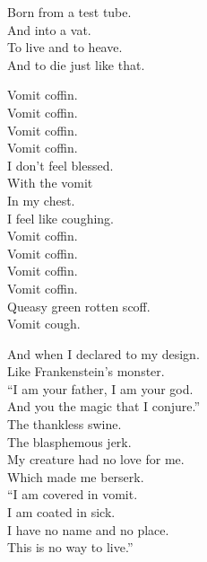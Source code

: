 Born from a test tube. \\
And into a vat. \\
To live and to heave. \\
And to die just like that. \\





Vomit coffin. \\
Vomit coffin. \\
Vomit coffin. \\
Vomit coffin. \\

I don't feel blessed. \\
With the vomit \\
In my chest. \\
I feel like coughing. \\

Vomit coffin. \\
Vomit coffin. \\
Vomit coffin. \\
Vomit coffin. \\

Queasy green rotten scoff. \\

Vomit cough. \\


And when I declared to my design. \\
Like Frankenstein's monster. \\
``I am your father, I am your god. \\
And you the magic that I conjure.'' \\

The thankless swine. \\
The blasphemous jerk. \\
My creature had no love for me. \\
Which made me berserk. \\

``I am covered in vomit. \\
I am coated in sick. \\
I have no name and no place. \\
This is no way to live.'' \\

